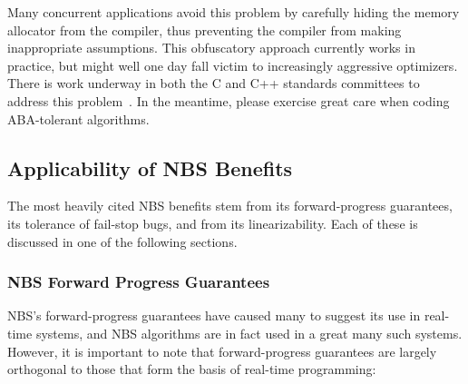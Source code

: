 \begin{fcvref}
Many concurrent applications avoid this problem by carefully hiding the
memory allocator from the compiler, thus preventing the compiler from
making inappropriate assumptions.
This obfuscatory approach currently works in practice, but might well
one day fall victim to increasingly aggressive optimizers.
There is work underway in both the C and C++ standards committees
to address this
problem~\cite{PaulEMcKenney2019PointerLifetimeEndZap,PaulEMcKenney2020PointerLifetimeEndZapCpp}.
In the meantime, please exercise great care when coding ABA-tolerant
algorithms.
\end{fcvref}

\QuickQuizEnd

\subsection{Applicability of NBS Benefits}
\label{sec:advsync:Applicability of NBS Benefits}

The most heavily cited NBS benefits stem from its forward-progress
guarantees, its tolerance of fail-stop bugs, and from its linearizability.
Each of these is discussed in one of the following sections.

\subsubsection{NBS Forward Progress Guarantees}
\label{sec:advsync:NBS Forward Progress Guarantees}

NBS's forward-progress guarantees have caused many to suggest its use in
real-time systems, and NBS algorithms are in fact used in a great many
such systems.
However, it is important to note that forward-progress guarantees are
largely orthogonal to those that form the basis of real-time programming:

